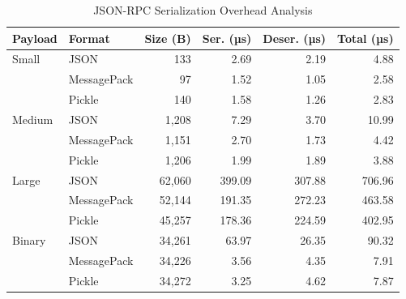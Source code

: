 
\begin{table}[h]
\centering
\caption{JSON-RPC Serialization Overhead Analysis}
\label{tab:serialization_benchmark}
\begin{tabular}{llrrrr}
\toprule
\textbf{Payload} & \textbf{Format} & \textbf{Size (B)} & \textbf{Ser. (µs)} & \textbf{Deser. (µs)} & \textbf{Total (µs)} \\
\midrule
Small & JSON & 133 & 2.69 & 2.19 & 4.88 \\
 & MessagePack & 97 & 1.52 & 1.05 & 2.58 \\
 & Pickle & 140 & 1.58 & 1.26 & 2.83 \\
Medium & JSON & 1,208 & 7.29 & 3.70 & 10.99 \\
 & MessagePack & 1,151 & 2.70 & 1.73 & 4.42 \\
 & Pickle & 1,206 & 1.99 & 1.89 & 3.88 \\
Large & JSON & 62,060 & 399.09 & 307.88 & 706.96 \\
 & MessagePack & 52,144 & 191.35 & 272.23 & 463.58 \\
 & Pickle & 45,257 & 178.36 & 224.59 & 402.95 \\
Binary & JSON & 34,261 & 63.97 & 26.35 & 90.32 \\
 & MessagePack & 34,226 & 3.56 & 4.35 & 7.91 \\
 & Pickle & 34,272 & 3.25 & 4.62 & 7.87 \\
\bottomrule
\end{tabular}
\end{table}
